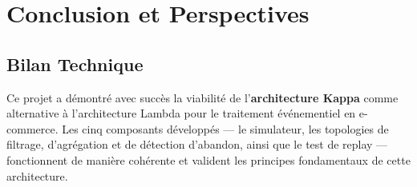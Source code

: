 \documentclass[a4paper,12pt]{report}
\begin{document}



\renewcommand{\thechapter}{\Roman{chapter}}


\newpage
\renewcommand{\contentsname}{Table des matières}
\tableofcontents
\newpage

\renewcommand{\listfigurename}{Liste des figures}
\listoffigures
\newpage

\renewcommand{\listtablename}{Liste des tableaux}
\listoftables
\newpage

\setcounter{page}{1}
\renewcommand{\thechapter}{\arabic{chapter}}
\setcounter{chapter}{0}









\chapter*{Conclusion et Perspectives}

\section*{Bilan Technique}

Ce projet a démontré avec succès la viabilité de l'\textbf{architecture Kappa} comme alternative à l'architecture Lambda pour le traitement événementiel en e-commerce. Les cinq composants développés --- le simulateur, les topologies de filtrage, d'agrégation et de détection d'abandon, ainsi que le test de replay --- fonctionnent de manière cohérente et valident les principes fondamentaux de cette architecture.
\end{document}
